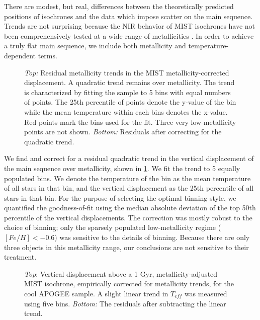\documentclass[manuscript]{aastex6}
\newcommand{\Teff}{\ensuremath{T_{eff}}}
\begin{document}
There are modest, but real, differences between the theoretically predicted
positions of isochrones and the data which impose scatter on the main sequence. 
Trends are not surprising because the NIR behavior of MIST isochrones have not 
been comprehensively tested at a wide range of metallicities \citep{Choi16}. 
In order to achieve a truly flat main sequence, we include both 
metallicity and temperature-dependent terms.

\begin{figure}[htb]
    \centering
    \caption{\emph{Top:} Residual metallicity trends in the MIST 
        metallicity-corrected displacement. A quadratic trend remains over 
        metallicity. The trend is characterized by fitting the sample to 
        5 bins with equal numbers of points.  The 25th percentile of points 
        denote the y-value of the bin while the mean temperature within each
        bins denotes the x-value. Red points mark the bins used for the fit. 
        Three very low-metallicity points are not shown. \emph{Bottom:} 
        Residuals after correcting for the quadratic trend.}\label{fig:met_trend}
\end{figure}

We find and correct for a residual quadratic trend in the vertical 
displacement of the main sequence over metallicity, shown in 
\cref{fig:met_trend}.  We fit the trend to 5 equally populated bins. We denote 
the temperature of the bin as the mean temperature of all stars in that bin, 
and the vertical displacement as the 25th percentile of all stars in that bin. 
For the purpose of selecting the optimal binning style, we quantified the 
goodness-of-fit using the median absolute deviation of the top 50th percentile 
of the vertical displacements. The correction was mostly robust to the choice 
of binning; only the sparsely populated low-metallicity regime 
(\([Fe/H] < -0.6\)) was sensitive to the details of binning. Because there are 
only three objects in this metallicity range, our conclusions are not 
sensitive to their treatment.

\begin{figure}[htb]
    \centering
    \caption{\emph{Top}: Vertical displacement above a 1 Gyr,
        metallicity-adjusted MIST isochrone, empirically corrected for
        metallicity trends, for the cool APOGEE sample. A 
        slight linear trend in \Teff{} was measured using five bins. 
        \emph{Bottom:} The residuals after subtracting the linear 
    trend.}\label{fig:apogee_teff_trend}
\end{figure}
\end{document}
